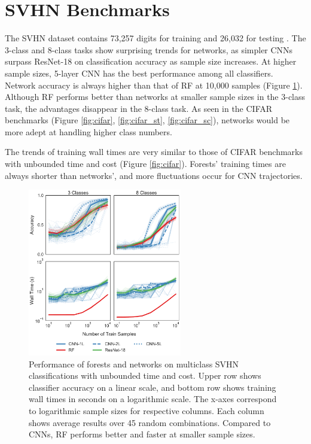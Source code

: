 \section{SVHN Benchmarks}
\label{app:svhn}
The SVHN dataset contains 73,257 digits for training and 26,032 for testing \citep{svhn}. The 3-class and 8-class tasks show surprising trends for networks, as simpler CNNs surpass ResNet-18 on classification accuracy as sample size increases. At higher sample sizes, 5-layer CNN has the best performance among all classifiers. Network accuracy is always higher than that of RF at 10,000 samples (Figure \ref{fig:svhn}). Although RF performs better than networks at smaller sample sizes in the 3-class task, the advantages disappear in the 8-class task. As seen in the CIFAR benchmarks (Figure \ref{fig:cifar}, \ref{fig:cifar_st}, \ref{fig:cifar_sc}), networks would be more adept at handling higher class numbers.

The trends of training wall times are very similar to those of CIFAR benchmarks with unbounded time and cost (Figure \ref{fig:cifar}). Forests' training times are always shorter than networks', and more fluctuations occur for CNN trajectories.

\begin{figure}[!htb]
\centering
\includegraphics[width=0.6\textwidth]{figures/svhn.pdf}
  \caption{Performance of forests and networks on multiclass SVHN classifications with unbounded time and cost.
  Upper row shows classifier accuracy on a linear scale, and bottom row shows training wall times in seconds on a logarithmic scale. The x-axes correspond to logarithmic sample sizes for respective columns. Each column shows average results over 45 random combinations.
  Compared to CNNs, RF performs better and faster at smaller sample sizes.
  }
\label{fig:svhn}
\end{figure}
\clearpage

